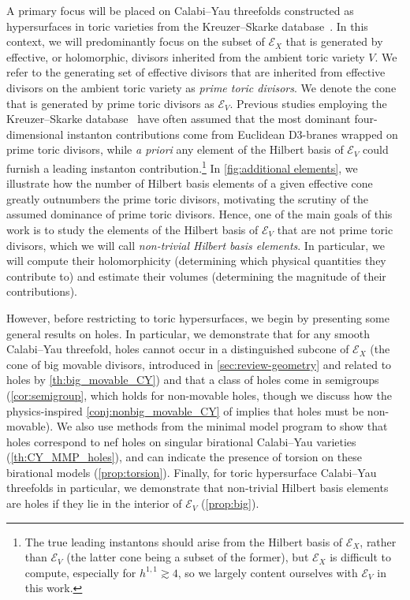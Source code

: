 \documentclass[11pt,dvipsnames]{article}
\theoremstyle{definition}
\newcommand{\cE}{\mathcal{E}}
\begin{document}
A primary focus will be placed on Calabi--Yau threefolds constructed as hypersurfaces in toric varieties from the Kreuzer--Skarke database~\cite{Kreuzer:2000xy}. In this context, we will predominantly focus on the subset of $\mathcal{E}_X$ that is generated by effective, or holomorphic, divisors inherited from the ambient toric variety $V$. We refer to the generating set of effective divisors that are inherited from effective divisors on the ambient toric variety as \textit{prime toric divisors}. We denote the cone that is generated by prime toric divisors as $\mathcal{E}_V$. 
Previous studies employing the Kreuzer--Skarke database~\cite{Gendler:2023kjt, Demirtas:2021nlu, McAllister:2024lnt, Sheridan:2024vtt,Gendler:2024adn,Cheng:2025ggf, Mehta:2021pwf} have often assumed that the most dominant four-dimensional instanton contributions come from Euclidean D3-branes wrapped on prime toric divisors, while \textit{a priori} any element of the Hilbert basis of $\mathcal{E}_V$ could furnish a leading instanton contribution.\footnote{The true leading instantons should arise from the Hilbert basis of $\mathcal{E}_X$, rather than $\mathcal{E}_V$ (the latter cone being a subset of the former), but $\mathcal{E}_X$ is difficult to compute, especially for $h^{1,1} \gtrsim 4$, so we largely content ourselves with $\mathcal{E}_V$ in this work.}
In \cref{fig:additional elements}, we illustrate how the number of Hilbert basis elements of a given effective cone greatly outnumbers the prime toric divisors, motivating the scrutiny of the assumed dominance of prime toric divisors.
Hence, one of the main goals of this work is to study the elements of the Hilbert basis of $\cE_V$ that are not prime toric divisors, which we will call \textit{non-trivial Hilbert basis elements}. In particular, we will compute their holomorphicity (determining which physical quantities they contribute to) and estimate their volumes (determining the magnitude of their contributions).

However, before restricting to toric hypersurfaces, we begin by presenting some general results on holes. In particular, we demonstrate that for any smooth Calabi--Yau threefold, holes cannot occur in a distinguished subcone of $\mathcal{E}_X$ (the cone of big movable divisors, introduced in \cref{sec:review-geometry} and related to holes by \cref{th:big_movable_CY}) and that a class of holes come in semigroups (\cref{cor:semigroup}, which holds for non-movable holes, though we discuss how the physics-inspired \cref{conj:nonbig_movable_CY} of \cite{Katz:2020ewz} implies that holes must be non-movable). We also use methods from the minimal model program to show that holes correspond to nef holes on singular birational Calabi--Yau varieties (\cref{th:CY_MMP_holes}), and can indicate the presence of torsion on these birational models (\cref{prop:torsion}). Finally, for toric hypersurface Calabi--Yau threefolds in particular, we demonstrate that non-trivial Hilbert basis elements are holes if they lie in the interior of $\mathcal{E}_V$ (\cref{prop:big}).
\end{document}
